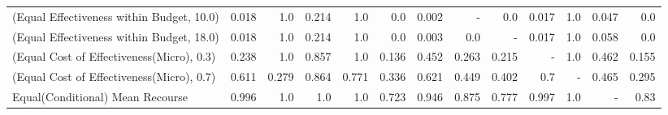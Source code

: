 \documentclass{article}
\begin{document}
\begin{table}[ht]
{\begin{tabular}{lrrrrrrrrrrrr}
(Equal Effectiveness within Budget, 10.0)          &                                     0.018 &                                       1.0 &                            0.214 &                              1.0 &                 0.0 &                                              0.002 &                                         - &                                       0.0 &                                     0.017 &                                       1.0 &                            0.047 &                                        0.0 \\
(Equal Effectiveness within Budget, 18.0)          &                                     0.018 &                                       1.0 &                            0.214 &                              1.0 &                 0.0 &                                              0.003 &                                       0.0 &                                         - &                                     0.017 &                                       1.0 &                            0.058 &                                        0.0 \\
(Equal Cost of Effectiveness(Micro), 0.3)          &                                     0.238 &                                       1.0 &                            0.857 &                              1.0 &               0.136 &                                              0.452 &                                     0.263 &                                     0.215 &                                         - &                                       1.0 &                            0.462 &                                      0.155 \\
(Equal Cost of Effectiveness(Micro), 0.7)          &                                     0.611 &                                     0.279 &                            0.864 &                            0.771 &               0.336 &                                              0.621 &                                     0.449 &                                     0.402 &                                       0.7 &                                         - &                            0.465 &                                      0.295 \\
Equal(Conditional) Mean Recourse                   &                                     0.996 &                                       1.0 &                              1.0 &                              1.0 &               0.723 &                                              0.946 &                                     0.875 &                                     0.777 &                                     0.997 &                                       1.0 &                                - &                                       0.83 \\

\end{tabular}}
\end{table}
\end{document}
